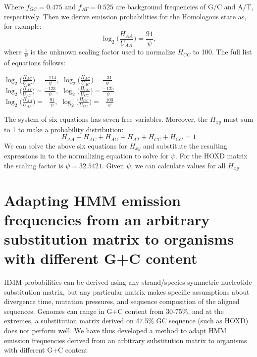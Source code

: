 Where $f_{GC}=0.475$ and $f_{AT}=0.525$ are background frequencies of
G/C and A/T, respectively.  Then we derive emission probabilities for
the Homologous state as, for example:
\begin{equation}
\log_{2}\bigg(\frac{H_{AA}}{U_{AA}}\bigg) = \frac{91}{\psi},
\end{equation}
where $\frac{1}{\psi}$ is the unknown scaling factor used to normalize $H_{CC}$ to 100. The full list of equations follows:
\begin{center}
$\log_{2}\bigg(\frac{H_{AC}}{U_{AC}}\bigg) = \frac{-114}{\psi},$
$\log_{2}\bigg(\frac{H_{AG}}{U_{AC}}\bigg) = \frac{-31}{\psi}$ \\
$\log_{2}\bigg(\frac{H_{AT}}{U_{AC}}\bigg) = \frac{-123}{\psi},$
$\log_{2}\bigg(\frac{H_{CG}}{U_{CC}}\bigg) = \frac{-125}{\psi}$ \\
$\log_{2}\bigg(\frac{H_{AA}}{U_{AA}}\bigg) = \ \ \ \frac{91}{\psi},$
$\log_{2}\bigg(\frac{H_{CC}}{U_{CC}}\bigg) = \ \ \ \frac{100}{\psi}$ \\
\end{center}

The system of six equations has seven free variables.  Moreover, the $H_{xy}$ must sum to 1 to make a probability distribution:
\begin{equation}
H_{AA} + H_{AC} + H_{AG} + H_{AT} + H_{CC} + H_{CG} = 1
\end{equation}
We can solve the above six equations for $H_{xy}$ and substitute the
resulting expressions in to the normalizing equation to solve for
$\psi$. For the HOXD matrix the scaling factor is $\psi=32.5421$. Given
$\psi$, we can calculate values for all $H_{xy}$.

\section*{Adapting HMM emission frequencies from an arbitrary substitution matrix to organisms with different G+C content}
HMM probabilities can be derived using any strand/species symmetric nucleotide substitution matrix,
but any particular matrix makes specific assumptions about divergence time, mutation pressures,
and sequence composition of the aligned sequences.
Genomes can range in G+C content from 30-75\%, and at the extremes,
a substitution matrix derived on 47.5\% GC sequence (such as HOXD) does not
perform well.  We have thus developed a method to adapt HMM emission
frequencies derived from an arbitrary substitution matrix
to organisms with different G+C content

